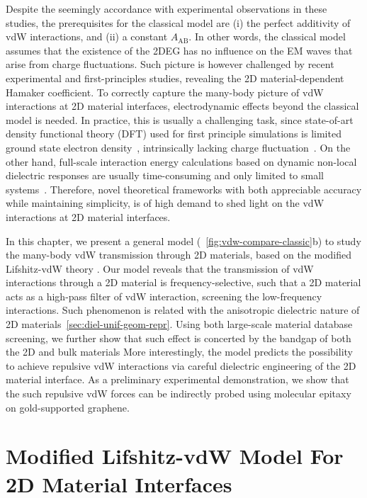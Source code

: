 Despite the seemingly accordance with experimental observations in
these studies, the prerequisites for the classical model are (i) the
perfect additivity of vdW interactions, and (ii) a constant
$A_{\mathrm{AB}}$. 
%
In other words, the classical model assumes that the existence of the
2DEG has no influence on the EM waves that arise from charge
fluctuations.
%
Such picture is however challenged by recent experimental
\cite{Tsoi_2014_vdW_screening_2D} and first-principles
\cite{Ambrosetti_2018_carbon,Liu_2018_gr,Li_2018_screen} studies,
revealing the 2D material-dependent Hamaker coefficient.
%
To correctly capture the many-body picture of vdW interactions at 2D
material interfaces, electro\-dynamic effects beyond the classical model
is needed.
%
In practice, this is usually a challenging task, since state-of-art
density functional theory (DFT) used for first principle simulations
is limited ground state electron density~\cite{Perdew_1996_GGA},
intrinsically lacking charge fluctuation~\cite{Woods_2016_rev_vdw}.
%
On the other hand, full-scale interaction energy calculations based on
dynamic non-local dielectric responses are usually time-consuming and
only limited to small
systems~\cite{Hermann_2017_vdW_rev,Zhou_2017_lifshitz}.
%
Therefore, novel theoretical frameworks with both appreciable accuracy
while maintaining simplicity, is of high demand to shed light on the
vdW interactions at 2D material interfaces.

In this chapter, we present
a general model (~\ref{fig:vdw-compare-classic}b) to study the many-body vdW transmission
through 2D materials, based on the modified Lifshitz-vdW theory
\cite{Dzyaloshinskii_1961_lifshitz,parsegian_van_2010_book}.
%
Our model reveals that the transmission of vdW interactions through a
2D material is frequency-selective, such that a 2D material acts as a high-pass
filter of vdW interaction, screening the low-frequency interactions.
%
Such phenomenon is related with the anisotropic dielectric nature of 2D materials~\autoref{sec:diel-unif-geom-repr}.
%
Using both large-scale material database
screening, we further show that such effect is concerted by the bandgap of both the
2D and bulk materials 
%
More interestingly, the model predicts the possibility to achieve
repulsive vdW interactions  via careful dielectric
engineering of the 2D material interface.
%
As a preliminary experimental demonstration, we show that the such
repulsive vdW forces can be indirectly probed using molecular epitaxy
on gold-supported graphene.

\section{Modified Lifshitz-vdW Model For 2D Material Interfaces}
\label{sec:vdw-model-lifshitz}

